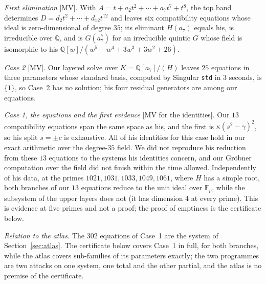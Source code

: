 \documentclass[11pt]{article}
\theoremstyle{remark}
\newcommand{\Q}{\mathbb{Q}}
\begin{document}
\emph{First elimination} [MV]. With $A=t+a_2t^2+\cdots+a_7t^7+t^8$, the top band determines
$D=d_2t^2+\cdots+d_{12}t^{12}$ and leaves six compatibility equations whose ideal is zero-dimensional of
degree $35$; its eliminant $H(a_7)$ equals his, is irreducible over $\Q$, and is $G(a_7^7)$ for an
irreducible quintic $G$ whose field is isomorphic to his $\Q[w]/(w^5-w^4+3w^3+3w^2+26)$.

\emph{Case 2} [MV]. Our layered solve over $K=\Q[a_7]/(H)$ leaves $25$ equations in three parameters whose
standard basis, computed by Singular \texttt{std} in $3$ seconds, is $\{1\}$, so Case~2 has no solution; his four residual generators are among our
equations.

\emph{Case 1, the equations and the first evidence} [MV for the identities]. Our $13$ compatibility equations span the
same space as his, and the first is $\kappa(s^2-\gamma)^2$, so his split $s=\pm c$ is exhaustive. All of
his identities for this case hold in our exact arithmetic over the degree-$35$ field. We did not reproduce
his reduction from these $13$ equations to the systems his identities concern, and our Gr\"obner
computation over the field did not finish within the time allowed. Independently of his data, at the
primes $1021,1031,1033,1049,1061$, where $H$ has a simple root, both branches of our $13$ equations reduce
to the unit ideal over $\mathbb{F}_p$, while the subsystem of the upper layers does not (it has dimension $4$ at every prime). This is evidence at five primes and not a proof;
the proof of emptiness is the certificate below.

\emph{Relation to the atlas.} The $302$ equations of Case~1 are the system of Section~\ref{sec:atlas}. The certificate below covers Case~1 in full, for both branches, while the atlas covers sub-families of its parameters exactly; the two
programmes are two attacks on one system, one total and the other partial, and the atlas is no premise of the certificate.
\end{document}
